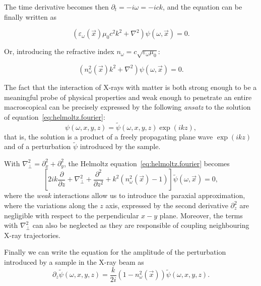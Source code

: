 The time derivative becomes then $\partial_t = - i\omega = -i c k$, and the
equation can be finally written as

\begin{equation*}
    \left( \varepsilon_\omega(\vec{x}) \mu_0 c^2 k^2 + \nabla^2
    \right) \psi(\omega, \vec{x}) = 0.
\end{equation*}

Or, introducing the refractive index $n_\omega =
c\sqrt{\varepsilon_\omega\mu_0}$:

\begin{equation}
    \left( n_\omega^2(\vec{x}) k^2 + \nabla^2
    \right) \psi(\omega, \vec{x}) = 0.\label{eq:helmoltz.fourier}
\end{equation}

The fact that the interaction of X-rays with matter is both strong enough to
be a meaningful probe of physical properties and weak enough to penetrate an
entire macroscopical can be precisely expressed by the following
\emph{ansatz} to the solution of equation~\eqref{eq:helmoltz.fourier}:
    \begin{equation*}
 \psi(\omega, x, y, z) = \tilde{\psi}(\omega, x, y, z) \exp(ikz),    
\end{equation*}
that is, the solution is a product of a freely propagating plane wave
$\exp(ikz)$ and of a perturbation $\tilde{\psi}$ introduced by the sample.

With  $\nabla_\perp^2 = \partial_x^2 + \partial_y^2$, the Helmoltz
equation~\eqref{eq:helmoltz.fourier} becomes
\begin{equation*}
    \left[ 2ik \frac{\partial}{\partial z} + \nabla_\perp^2 +
    \frac{\partial^2}{\partial z ^2} + k^2 (n^2_\omega(\vec{x}) - 1)
\right]\tilde{\psi}(\omega, \vec{x}) = 0,
\end{equation*}
where the \emph{weak} interactions allow us to introduce the paraxial
approximation, where the variations along the $z$ axis, expressed by the
second derivative $\partial_z^2$ are negligible with
respect to the perpendicular $x-y$ plane. Moreover, the terms with
$\nabla_\perp^2$ can also be neglected as they are responsible of coupling
neighbouring X-ray trajectories.

Finally we can write the equation for the amplitude of the perturbation introduced by a
sample in the X-ray beam as
\begin{equation}
    \partial_z \tilde{\psi}(\omega, x, y, z) =
    \frac{k}{2i}(1 - n^2_\omega(\vec{x}))\tilde{\psi}(\omega, x, y, z).
    \label{eq:helmoltz.perturbation}
\end{equation}

